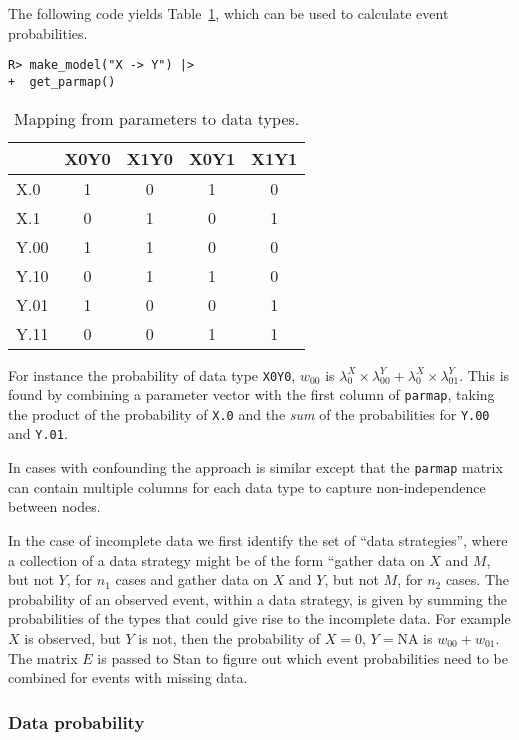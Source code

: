 \documentclass[
  11pt,
  article]{jss}
\begin{document}
The following code yields Table~\ref{tbl-parmap}, which can be used to
calculate event probabilities.

\begin{verbatim}
R> make_model("X -> Y") |> 
+  get_parmap() 
\end{verbatim}

\hypertarget{tbl-parmap}{}
\begin{table}
\caption{\label{tbl-parmap}Mapping from parameters to data types. }\tabularnewline

\centering
\begin{tabular}{lcccc}
\toprule
  & X0Y0 & X1Y0 & X0Y1 & X1Y1\\
\midrule
X.0 & 1 & 0 & 1 & 0\\
X.1 & 0 & 1 & 0 & 1\\
Y.00 & 1 & 1 & 0 & 0\\
Y.10 & 0 & 1 & 1 & 0\\
Y.01 & 1 & 0 & 0 & 1\\
Y.11 & 0 & 0 & 1 & 1\\
\bottomrule
\end{tabular}
\end{table}

For instance the probability of data type \texttt{X0Y0}, \(w_{00}\) is
\(\lambda^X_0\times \lambda^Y_{00} + \lambda^X_0\times \lambda^Y_{01}\).
This is found by combining a parameter vector with the first column of
\texttt{parmap}, taking the product of the probability of \texttt{X.0}
and the \emph{sum} of the probabilities for \texttt{Y.00} and
\texttt{Y.01}.

In cases with confounding the approach is similar except that the
\texttt{parmap} matrix can contain multiple columns for each data type
to capture non-independence between nodes.

In the case of incomplete data we first identify the set of ``data
strategies'', where a collection of a data strategy might be of the form
``gather data on \(X\) and \(M\), but not \(Y\), for \(n_1\) cases and
gather data on \(X\) and \(Y\), but not \(M\), for \(n_2\) cases. The
probability of an observed event, within a data strategy, is given by
summing the probabilities of the types that could give rise to the
incomplete data. For example \(X\) is observed, but \(Y\) is not, then
the probability of \(X=0\), \(Y = \text{NA}\) is \(w_{00} +w_{01}\). The
matrix \(E\) is passed to Stan to figure out which event probabilities
need to be combined for events with missing data.

\hypertarget{data-probability}{%
\subsubsection{Data probability}\label{data-probability}}
\end{document}
